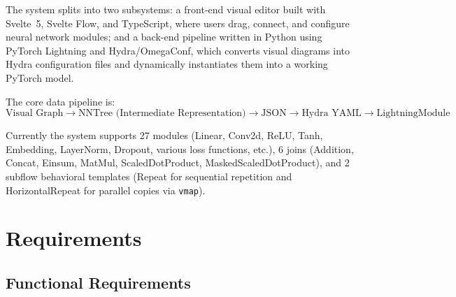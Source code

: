 \documentclass[11pt,a4paper]{article}
\begin{document}
The system splits into two subsystems: a front-end visual editor built with Svelte~5, Svelte Flow, and TypeScript,
where users drag, connect, and configure neural network modules; and a back-end pipeline
written in Python using PyTorch Lightning and Hydra/OmegaConf, which converts visual diagrams into
Hydra configuration files and dynamically instantiates them into a working PyTorch model.

The core data pipeline is:
\[
	\text{Visual Graph} \rightarrow \text{NNTree (Intermediate Representation)} \rightarrow \text{JSON} \rightarrow \text{Hydra YAML} \rightarrow \text{LightningModule}
\]

Currently the system supports 27 modules (Linear, Conv2d, ReLU, Tanh, Embedding, LayerNorm,
Dropout, various loss functions, etc.), 6 joins (Addition, Concat, Einsum, MatMul,
ScaledDotProduct, MaskedScaledDotProduct), and 2 subflow behavioral templates
(Repeat for sequential repetition and HorizontalRepeat for parallel copies via \texttt{vmap}).

\section{Requirements}

\subsection{Functional Requirements}
\end{document}
